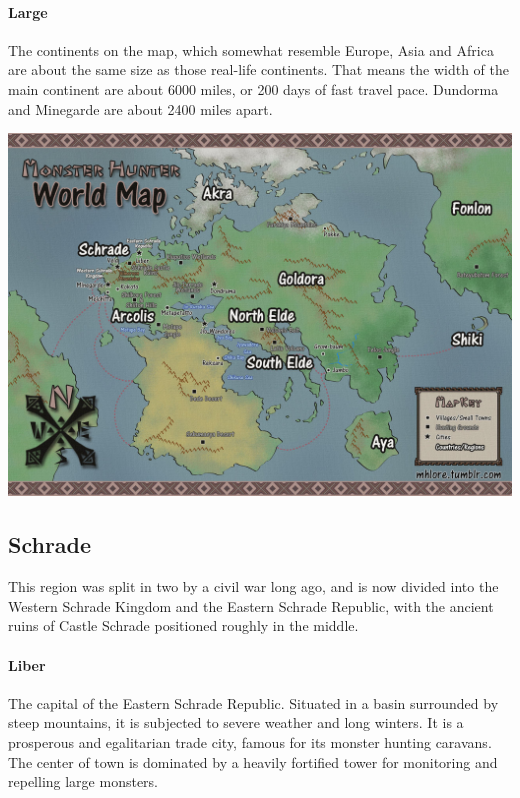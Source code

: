 \paragraph{Large} The continents on the map, which somewhat resemble Europe, Asia and Africa are about the same size as those real-life continents. That means the width of the main continent are about 6000 miles, or 200 days of fast travel pace. Dundorma and Minegarde are about 2400 miles apart.

\hbWideBottomArtFirstPageFix

\begin{hbNoteWide2}[b]
\includegraphics[width=\textwidth]{assets/ext/MHMap.jpg}
\end{hbNoteWide2}

\subsection*{Schrade}
This region was split in two by a civil war long ago, and is now divided into the Western Schrade Kingdom and the Eastern Schrade Republic, with the ancient ruins of Castle Schrade positioned roughly in the middle.

\paragraph{Liber} The capital of the Eastern Schrade Republic. Situated in a basin surrounded by steep mountains, it is subjected to severe weather and long winters. It is a prosperous and egalitarian trade city, famous for its monster hunting caravans. The center of town is dominated by a heavily fortified tower for monitoring and repelling large monsters.

